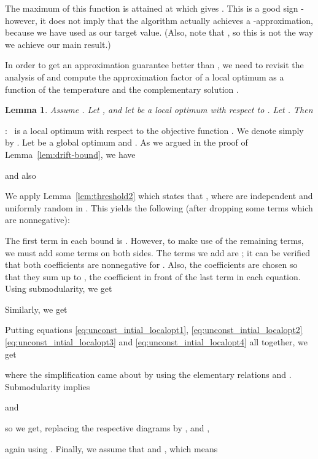 \documentclass{article}[11pt]
\newtheorem{lemma}[theorem]{Lemma}
\renewenvironment{proof}{\noindent{\bf Proof}:~}{\\}
\begin{document}
The maximum of this function is attained at  which gives .
This is a good sign - however, it does not imply that the algorithm actually achieves
a -approximation, because we have used  as our target value.
(Also, note that , so this is not the way we achieve our main result.)

In order to get an approximation guarantee better than , we need to revisit the analysis of \cite{FMV07}
and compute the approximation factor of a local optimum as a function of the temperature 
and the complementary solution .

\begin{lemma}
\label{lem:starting-point}
Assume .
Let ,  and
let  be a local optimum with respect to .
Let . Then 

\end{lemma}

\begin{proof}
 is a local optimum with respect to the objective function .
We denote  simply by . Let  be a global optimum and .
As we argued in the proof of Lemma~\ref{lem:drift-bound}, we have

and also

We apply Lemma~\ref{lem:threshold2} which states that
,
where  are independent and uniformly random in .
This yields the following (after dropping some terms which are nonnegative):

The first term in each bound is .
However, to make use of the remaining terms, we must add some terms on both sides.
The terms we add are ;
it can be verified that both coefficients are nonnegative for .
Also, the coefficients are chosen so that they sum up to ,
the coefficient in front of the last term in each equation. Using submodularity, we get

Similarly, we get

Putting equations \eqref{eq:unconst_intial_localopt1}, \eqref{eq:unconst_intial_localopt2} \eqref{eq:unconst_intial_localopt3} and \eqref{eq:unconst_intial_localopt4} all together, we get

where the simplification came about by using the elementary relations
  and .
Submodularity implies 

and 

so we get, replacing the respective diagrams by ,  and ,

again using .
Finally, we assume that  and , which means

\end{proof}
\end{document}
